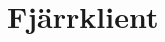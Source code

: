 \documentclass[designspec/spec.tex]{subfiles}
\begin{document}
\section{Fjärrklient}
\end{document}
